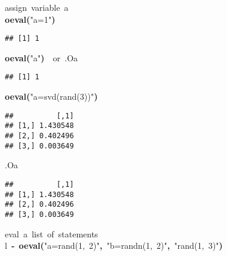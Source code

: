 \documentclass[english,10pt,a4paper]{article}\usepackage{graphicx, color}
\makeatletter
\newcommand{\hlfunctioncall}[1]{\textcolor[rgb]{0.501960784313725,0,0.329411764705882}{\textbf{#1}}}%
\newcommand{\hlstring}[1]{\textcolor[rgb]{0.6,0.6,1}{#1}}%
\newcommand{\hlkeyword}[1]{\textcolor[rgb]{0,0,0}{\textbf{#1}}}%
\newcommand{\hlcomment}[1]{\textcolor[rgb]{0.180392156862745,0.6,0.341176470588235}{#1}}%
\newcommand{\hlassignement}[1]{\textcolor[rgb]{0,0,0}{\textbf{#1}}}%
\newcommand{\hlsymbol}[1]{\textcolor[rgb]{0,0,0}{#1}}%
\newcommand{\hlstd}[1]{\textcolor[rgb]{0,0,0}{#1}}%
\newenvironment{kframe}{%
 \def\FrameCommand##1{\hskip\@totalleftmargin \hskip-\fboxsep
 \colorbox{shadecolor}{##1}\hskip-\fboxsep
     \hskip-\linewidth \hskip-\@totalleftmargin \hskip\columnwidth}%
 \MakeFramed {\advance\hsize-\width
   \@totalleftmargin\z@ \linewidth\hsize
   \@setminipage}}%
 {\par\unskip\endMakeFramed}
\newenvironment{knitrout}{}{} %
\makeatother
\begin{document}
\begin{knitrout}
\color{fgcolor}\begin{kframe}
\begin{flushleft}
\ttfamily\noindent
\hlcomment{\usebox{\hlnormalsizeboxhash}{\ }assign{\ }variable{\ }\usebox{\hlnormalsizeboxsinglequote}a\usebox{\hlnormalsizeboxsinglequote}}\hspace*{\fill}\\
\hlstd{}\hlfunctioncall{o\usebox{\hlnormalsizeboxunderscore}eval}\hlkeyword{(}\hlstring{"{}a=1"{}}\hlkeyword{)}\mbox{}
\normalfont
\end{flushleft}
\begin{verbatim}
## [1] 1
\end{verbatim}
\begin{flushleft}
\ttfamily\noindent
\hlfunctioncall{o\usebox{\hlnormalsizeboxunderscore}eval}\hlkeyword{(}\hlstring{"{}a"{}}\hlkeyword{)}{\ }{\ }\hlcomment{\usebox{\hlnormalsizeboxhash}{\ }or{\ }.O\usebox{\hlnormalsizeboxdollar}a}\mbox{}
\normalfont
\end{flushleft}
\begin{verbatim}
## [1] 1
\end{verbatim}
\begin{flushleft}
\ttfamily\noindent
\hlfunctioncall{o\usebox{\hlnormalsizeboxunderscore}eval}\hlkeyword{(}\hlstring{"{}a=svd(rand(3))"{}}\hlkeyword{)}\mbox{}
\normalfont
\end{flushleft}
\begin{verbatim}
##          [,1]
## [1,] 1.430548
## [2,] 0.402496
## [3,] 0.003649
\end{verbatim}
\begin{flushleft}
\ttfamily\noindent
\hlsymbol{.O}\hlkeyword{\usebox{\hlnormalsizeboxdollar}}\hlsymbol{a}\mbox{}
\normalfont
\end{flushleft}
\begin{verbatim}
##          [,1]
## [1,] 1.430548
## [2,] 0.402496
## [3,] 0.003649
\end{verbatim}
\begin{flushleft}
\ttfamily\noindent
\hlcomment{\usebox{\hlnormalsizeboxhash}{\ }eval{\ }a{\ }list{\ }of{\ }statements}\hspace*{\fill}\\
\hlstd{}\hlsymbol{l}{\ }\hlassignement{\usebox{\hlnormalsizeboxlessthan}-}{\ }\hlfunctioncall{o\usebox{\hlnormalsizeboxunderscore}eval}\hlkeyword{(}\hlstring{"{}a=rand(1,{\ }2)"{}}\hlkeyword{,}{\ }\hlstring{"{}b=randn(1,{\ }2)"{}}\hlkeyword{,}{\ }\hlstring{"{}rand(1,{\ }3)"{}}\hlkeyword{)}\hspace*{\fill}\\

\end{flushleft}
\end{kframe}
\end{knitrout}
\end{document}
